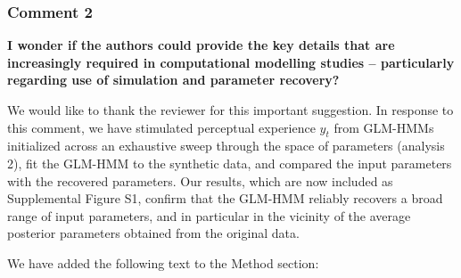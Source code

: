 \documentclass[
]{article}
\begin{document}
\subsubsection{Comment 2}\label{comment-2-1}

\textbf{I wonder if the authors could provide the key details that are
increasingly required in computational modelling studies -- particularly
regarding use of simulation and parameter recovery?}

We would like to thank the reviewer for this important suggestion. In
response to this comment, we have stimulated perceptual experience
\(y_t\) from GLM-HMMs initialized across an exhaustive sweep through the
space of parameters (analysis 2), fit the GLM-HMM to the synthetic data,
and compared the input parameters with the recovered parameters. Our
results, which are now included as Supplemental Figure S1, confirm that
the GLM-HMM reliably recovers a broad range of input parameters, and in
particular in the vicinity of the average posterior parameters obtained
from the original data.

We have added the following text to the Method section:
\end{document}
